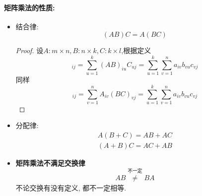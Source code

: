 \paragraph{矩阵乘法的性质:}
\begin{itemize}
    \item 结合律:\begin{equation}
    \left( AB \right) C =A\left( BC \right) 
    \end{equation}
    \begin{proof}
      设$A:m \times n, B: n \times k, C: k \times l$,根据定义
      \begin{equation}
        [(AB)C]_{ij} = \sum_{u=1}^{k} (AB)_{iu} C _{uj} = \sum_{u=1}^{k} \sum_{v=1}^{n} a_{iv} b_{vu} c_{vj} 
      \end{equation}
      同样
      \begin{equation}
          [A(BC)]_{ij} = \sum_{v=1}^{n} A_{iv}(BC)_{vj} = \sum_{u=1}^{k} \sum_{v=1}^{n} a_{iv} b_{vu} c_{vj} 
      \end{equation}
  \end{proof}
    \item 分配律:\begin{align}
  A\left( B+C \right) = AB+AC
  \\
  \left( A+B \right) C = AC+AB
\end{align}
    \item \textbf{矩阵乘法不满足交换律}\begin{equation}
  AB \mathop{\neq }\limits^{\text{不一定}}_{} BA
\end{equation}不论交换有没有定义, 都不一定相等.
\end{itemize}



